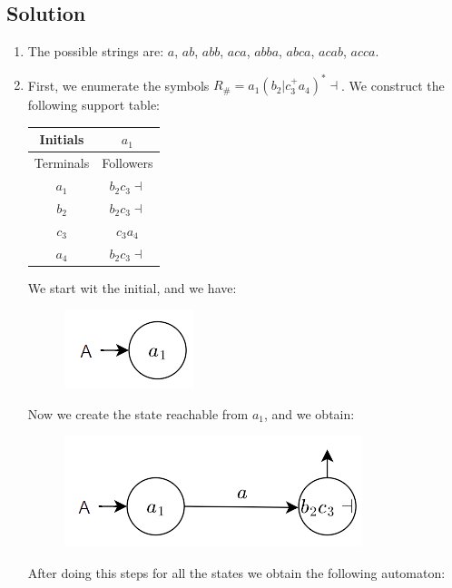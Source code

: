 \documentclass[12pt, a4paper]{report}
\begin{document}
    \subsection*{Solution}
    \begin{enumerate}
        \item The possible strings are: $a$, $ab$, $abb$, $aca$, $abba$, $abca$, $acab$, $acca$. 
        \item First, we enumerate the symbols $R_{\#}=a_1\left( b_2|c^{+}_{3}a_4 \right)^{*}\dashv$. We construct the following support table: 
            \begin{table}[H]
                \centering
                \begin{tabular}{cc}
                Initials                       & $a_1$             \\ \hline
                \multicolumn{1}{c|}{Terminals} & Followers         \\
                \multicolumn{1}{c|}{$a_1$}     & $b_2c_3\dashv$ \\
                \multicolumn{1}{c|}{$b_2$}     & $b_2c_3\dashv$  \\
                \multicolumn{1}{c|}{$c_3$}     & $c_3a_4$         \\
                \multicolumn{1}{c|}{$a_4$}     & $b_2c_3\dashv$ 
                \end{tabular}
            \end{table}
            We start wit the initial, and we have: 
            \begin{figure}[H]
                \centering
                \includegraphics[width=0.2\linewidth]{images/FSA1.png}
            \end{figure}
            Now we create the state reachable from $a_1$, and we obtain: 
            \begin{figure}[H]
                \centering
                \includegraphics[width=0.4\linewidth]{images/FSA2.png}
            \end{figure}
            After doing this steps for all the states we obtain the following automaton: 

\end{enumerate}
\end{document}
